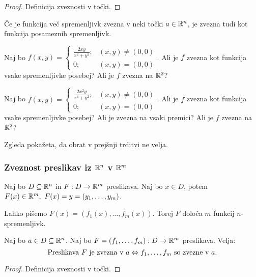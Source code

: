 \begin{proof}
    Definicija zveznosti v točki.
\end{proof}

\begin{opomba}
    Če je funkcija več spremenljivk zvezna v neki točki $a \in \mathbb{R}^n$, je zvezna tudi kot funkcija posameznih spremenljivk.
\end{opomba}

\begin{zgled}
    Naj bo $f(x,y) = \begin{cases}
        \frac{2xy}{x^2+y^2}; &(x,y) \neq (0,0) \\
        0; &(x,y) = (0,0)
    \end{cases}$. Ali je $f$ zvezna kot funkcija vsake spremenljivke posebej? Ali je $f$ zvezna na $\mathbb{R}^2$?
\end{zgled}

\begin{zgled}
    Naj bo $f(x,y) = \begin{cases}
        \frac{2x^2y}{x^4+y^2}; &(x,y) \neq (0,0) \\
        0; &(x,y) = (0,0)
    \end{cases}$. Ali je $f$ zvezna kot funkcija vsake spremenljivke posebej? Ali je zvezna na vsaki premici? Ali je $f$ zvezna na $\mathbb{R}^2$?
\end{zgled}

\begin{opomba}
    Zgleda pokažeta, da obrat v prejšnji trditvi ne velja.
\end{opomba}

\newpage
\subsubsection{Zveznost preslikav iz $\mathbb{R}^n$ v $\mathbb{R}^m$}
Naj bo $D \subseteq \mathbb{R}^n$ in $F: D \to \mathbb{R}^m$ preslikava. Naj bo $x \in D$, potem $F(x) \in \mathbb{R}^m, \ F(x) = y = (y_1, \ldots, y_m)$.

Lahko pišemo $F(x) = (f_1(x), \ldots, f_m(x))$. Torej $F$ določa $m$ funkcij $n$-spremenljivk.

\begin{trditev}
    Naj bo $a \in D \subseteq \mathbb{R}^n$. Naj bo $F=(f_1, \ldots, f_m): D \to \mathbb{R}^m$ preslikava. Velja:
    $$\text{Preslikava } F \text{ je zvezna v } a \Leftrightarrow f_1,\ldots, f_m \text{ so zvezne v } a.$$
\end{trditev}

\begin{proof}
    Definicija zveznosti v točki.
\end{proof}

